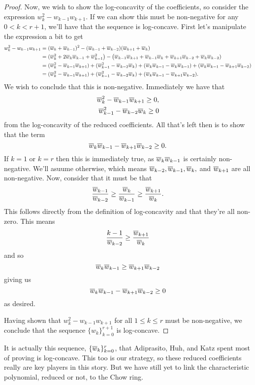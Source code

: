 \documentclass[12pt,oneside]{../../sfsuthesis}
\begin{document}
\begin{proof}
    Now, we wish to show the log-concavity of the coefficients, so consider the expression \( w_k^2 - w_{k-1}w_{k+1} \).
    If we can show this must be non-negative for any \( 0 < k < r+1 \), we'll have that the sequence is log-concave.
    First let's manipulate the expression a bit to get
    \begin{align*}
        w_k^2 - w_{k-1}w_{k+1} & = (\overline{w}_k + \overline{w}_{k-1})^2 - (\overline{w}_{k-1} + \overline{w}_{k-2})(\overline{w}_{k+1} + \overline{w}_{k})                                                                               \\
                               & = (\overline{w}_k^2 + 2\overline{w}_k \overline{w}_{k-1} + \overline{w}_{k-1}^2 \big) - \big( \overline{w}_{k-1} \overline{w}_{k+1} + \overline{w}_{k-1}\overline{w}_{k} + \overline{w}_{k+1}\overline{w}_{k-2} + \overline{w}_{k} \overline{w}_{k-2})           \\
                               & = (\overline{w}_k^2 - \overline{w}_{k-1}\overline{w}_{k+1}) + (\overline{w}_{k-1}^2 - \overline{w}_{k-2}\overline{w}_{k}) + (\overline{w}_k \overline{w}_{k-1} - \overline{w}_k \overline{w}_{k-1}) + (\overline{w}_k \overline{w}_{k-1} - \overline{w}_{k+1} \overline{w}_{k-2} ) \\
                               & = (\overline{w}_k^2 - \overline{w}_{k-1}\overline{w}_{k+1}) + (\overline{w}_{k-1}^2 - \overline{w}_{k-2}\overline{w}_{k}) + (\overline{w}_k \overline{w}_{k-1} - \overline{w}_{k+1} \overline{w}_{k-2} ).
    \end{align*}
    We wish to conclude that this is non-negative.
    Immediately we have that
    \begin{align*}
        \overline{w}_k^2 - \overline{w}_{k-1}\overline{w}_{k+1} \geq 0, \\
        \overline{w}_{k-1}^2 - \overline{w}_{k-2}\overline{w}_{k} \geq 0
    \end{align*}
    from the log-concavity of the reduced coefficients.
    All that's left then is to show that the term
    \[
        \overline{w}_k \overline{w}_{k-1} - \overline{w}_{k+1} \overline{w}_{k-2} \geq 0.
    \]
    If \( k = 1 \) or \( k = r \) then this is immediately true, as \(\overline{w}_k \overline{w}_{k-1}\) is certainly non-negative.
    We'll asuume otherwise, which means \( \overline{w}_{k-2}, \overline{w}_{k-1}, \overline{w}_k, \) and \( \overline{w}_{k+1} \) are all non-negative.
    Now, consider that it must be that
    \[
        \frac{\overline{w}_{k-1}}{\overline{w}_{k-2}} \geq \frac{\overline{w}_k}{\overline{w}_{k-1}} \geq \frac{\overline{w}_{k+1}}{\overline{w}_k}.
    \]
    This follows directly from the definition of log-concavity and that they're all non-zero.
    This means
    \[
        \frac{k-1}{\overline{w}_{k-2}} \geq \frac{\overline{w}_{k+1}}{\overline{w}_k}
    \]
    and so
    \[
        \overline{w}_k \overline{w}_{k-1} \geq \overline{w}_{k+1} \overline{w}_{k-2}
    \]
    giving us
    \[
        \overline{w}_k \overline{w}_{k-1} - \overline{w}_{k+1} \overline{w}_{k-2} \geq 0
    \]
    as desired.

    Having shown that \( w_k^2 - w_{k-1}w_{k+1} \) for all \( 1 \leq k \leq r \) must be non-negative, we conclude that the sequence \( \{ w_k \}_{k=0}^{r+1} \) is log-concave.

\end{proof}
It is actually this sequence, \(\{\overline{w}_k\}_{k=0}^r \), that Adiprasito, Huh, and Katz spent most of \cite{adiprasitoHodgeTheoryCombinatorial2018} proving is log-concave.
This too is our strategy, so these reduced coefficients really are key players in this story.
But we have still yet to link the characteristic polynomial, reduced or not, to the Chow ring.
\end{document}
